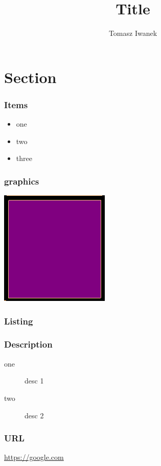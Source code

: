 \documentclass{beamer}
\title{Title}
\author{Tomasz Iwanek}
\begin{document}
 
\frame{\titlepage}
 
\section{Section} 
 
\begin{frame}
\frametitle{Items}
\begin{itemize}
\item one
\item two
\item three
\end{itemize}
\end{frame}

\begin{frame}
\frametitle{graphics}
\includegraphics[scale=1.0]{img/logo.png}
\end{frame}

\begin{frame}
\frametitle{Listing}

\end{frame}

\begin{frame}
\frametitle{Description}
\begin{description}
\item[one] desc 1
\item[two] desc 2
\end{description}
\end{frame} 

\begin{frame}
\frametitle{URL}
\url{https://google.com}
\end{frame} 
 
\end{document}
